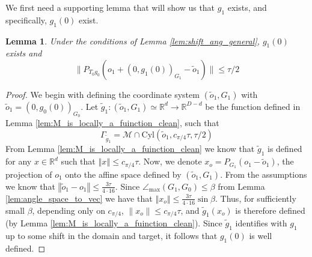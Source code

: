 \documentclass[12pt]{article}
\newtheorem{Lemma}[Theorem]{Lemma}
\theoremstyle{remark}
\newcommand{\RR}{\mathbb{R}}
\newcommand{\MM}{\mathcal{M}}
\newcommand{\norm}[1]{\left\Vert #1 \right\Vert}
\newcommand{\wtilde}[1]{\widetilde{#1}}
\newcommand{\maxangle}{\angle_{\max}}
\begin{document}
\begin{appendices}
We first need a supporting lemma that will show us that $g_{1}$ exists, and specifically, $g_{1}(0)$ exist.
\begin{Lemma} \label{lem:rough_w_bound}
Under the conditions of Lemma \ref{lem:shift_ang_general}, $g_{1}(0)$ exists and 
\[
\|P_{T_0 g_0} (o_1 + (0, g_{1}(0))_{G_1} - \tilde o_1) \| \leq \tau/2
\]
\end{Lemma}
\begin{proof}
We begin with defining the coordinate system $(\tilde o_1, G_1)$ with $\tilde o_1 = (0, g_0(0))_{G_0}$. Let $\wtilde g_1:(\wtilde o_1,G_1) \simeq \RR^d \to \RR^{D-d}$ be the function defined in Lemma \ref{lem:M_is_locally_a_fuinction_clean}, such that 
\[
\Gamma_{\wtilde g_1} =  \MM \cap \textrm{Cyl}(\wtilde o_1,c_{\pi/4}\tau, \tau/2)
\]
From Lemma \ref{lem:M_is_locally_a_fuinction_clean} we know that $\wtilde g_1$ is defined for any $x\in \RR^d$ such that $\norm{x} \leq c_{\pi/4}\tau$.
Now, we denote $x_o = P_{G_1}(o_1 - \tilde o_1)$, the projection of $o_1$ onto the affine space defined by $(\tilde o_1, G_1)$.
From the assumptions we know that $\norm {\tilde o_1 - o_1} \leq  \frac{3\tau}{4 \cdot 16}$. 
Since $\maxangle (G_1,G_0) \leq \beta$ from Lemma \ref{lem:angle_space_to_vec} we have that $\norm{x_o} \leq \frac{3\tau}{4 \cdot 16} \sin \beta$. 
Thus, for sufficiently small $\beta$, depending only on $c_{\pi/4}$, $\|x_o\| \leq c_{\pi/4}
\tau$, and $\wtilde{g}_1(x_o)$ is therefore defined (by Lemma \ref{lem:M_is_locally_a_fuinction_clean}). Since $\wtilde g_1$ identifies with $g_1$ up to some shift in the domain and target, it follows that $g_1(0)$ is well defined.


\end{proof}
\end{appendices}
\end{document}
